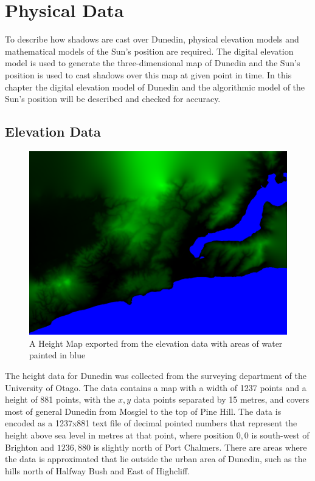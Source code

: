 \documentclass[12pt]{report}
\begin{document}
\chapter{Physical Data}
To describe how shadows are cast over Dunedin, physical elevation models and mathematical models of the Sun's position are required. The digital elevation model is used to generate the three-dimensional map of Dunedin and the Sun's position is used to cast shadows over this map at given point in time. In this chapter the digital elevation model of Dunedin and the algorithmic model of the Sun's position will be described and checked for accuracy.

\section{Elevation Data}

\begin{figure}[h]
\includegraphics[width=\textwidth]{heightmapandwater.png}
\caption{A Height Map exported from the elevation data with areas of water painted in blue}
\label{image:elevation-water}
\end{figure}
The height data for Dunedin was collected from the surveying department of the University of Otago. The data contains a map with a width of 1237 points and a height of 881 points, with the $x,y$ data points separated by 15 metres, and covers most of general Dunedin from Mosgiel to the top of Pine Hill. The data is encoded as a 1237x881 text file of decimal pointed numbers that represent the height above sea level in metres at that point, where position $0,0$ is south-west of Brighton and $1236,880$ is slightly north of Port Chalmers. There are areas where the data is approximated that lie outside the urban area of Dunedin, such as the hills north of Halfway Bush and East of Highcliff.
\end{document}
